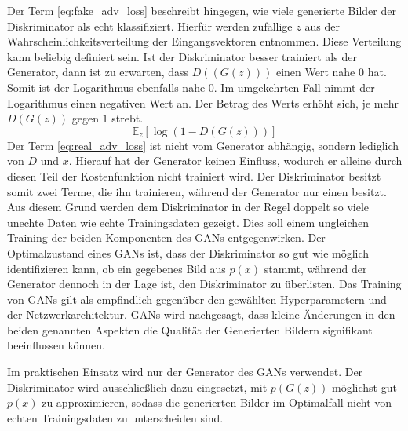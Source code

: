 Der Term \ref{eq:fake_adv_loss} beschreibt hingegen, wie viele generierte Bilder der Diskriminator als echt klassifiziert. Hierfür werden zufällige $z$ aus der Wahrscheinlichkeitsverteilung der Eingangsvektoren entnommen. Diese Verteilung kann beliebig definiert sein. Ist der Diskriminator besser trainiert als der Generator, dann ist zu erwarten, dass $D((G(z)))$ einen Wert nahe $0$ hat. Somit ist der Logarithmus ebenfalls nahe $0$. Im umgekehrten Fall nimmt der Logarithmus einen negativen Wert an. Der Betrag des Werts erhöht sich, je mehr $D(G(z))$ gegen $1$ strebt.
\begin{equation}
   \label{eq:fake_adv_loss}
	\mathbb{E}_{z}[\log(1-D(G(z)))]
\end{equation}
Der Term \ref{eq:real_adv_loss} ist nicht vom Generator abhängig, sondern lediglich von $D$ und $x$. Hierauf hat der Generator keinen Einfluss, wodurch er alleine durch diesen Teil der Kostenfunktion nicht trainiert wird. Der Diskriminator besitzt somit zwei Terme, die ihn trainieren, während der Generator nur einen besitzt. Aus diesem Grund werden dem Diskriminator in der Regel doppelt so viele unechte Daten wie echte Trainingsdaten gezeigt. Dies soll einem ungleichen Training der beiden Komponenten des \acp{GAN} entgegenwirken. Der Optimalzustand eines \acp{GAN} ist, dass der Diskriminator so gut wie möglich identifizieren kann, ob ein gegebenes Bild aus $p(x)$ stammt, während der Generator dennoch in der Lage ist, den Diskriminator zu überlisten. Das Training von \acp{GAN} gilt als empfindlich gegenüber den gewählten Hyperparametern und der Netzwerkarchitektur. \acp{GAN} wird nachgesagt, dass kleine Änderungen in den beiden genannten Aspekten die Qualität der Generierten Bildern signifikant beeinflussen können. \cite{visualApproach}

Im praktischen Einsatz wird nur der Generator des \acp{GAN} verwendet. Der Diskriminator wird ausschließlich dazu eingesetzt, mit $p(G(z))$ möglichst gut $p(x)$ zu approximieren, sodass die generierten Bilder im Optimalfall nicht von echten Trainingsdaten zu unterscheiden sind. \cite{visualApproach}


